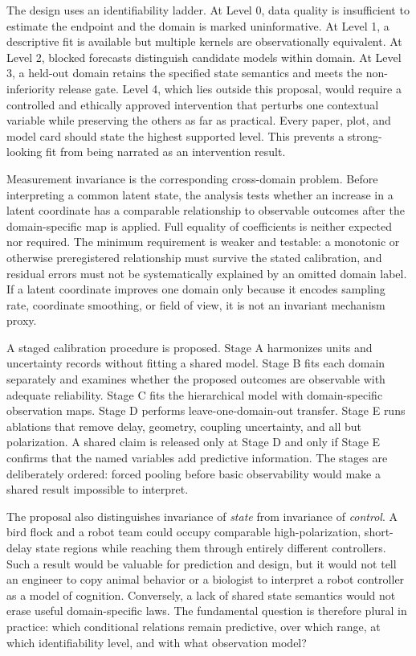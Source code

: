 \documentclass[conference]{../../../../Conference-LaTeX-template_10-17-19/IEEEtran}
\begin{document}
The design uses an identifiability ladder. At Level 0, data quality is insufficient to estimate the endpoint and the domain is marked uninformative. At Level 1, a descriptive fit is available but multiple kernels are observationally equivalent. At Level 2, blocked forecasts distinguish candidate models within domain. At Level 3, a held-out domain retains the specified state semantics and meets the non-inferiority release gate. Level 4, which lies outside this proposal, would require a controlled and ethically approved intervention that perturbs one contextual variable while preserving the others as far as practical. Every paper, plot, and model card should state the highest supported level. This prevents a strong-looking fit from being narrated as an intervention result.

Measurement invariance is the corresponding cross-domain problem. Before interpreting a common latent state, the analysis tests whether an increase in a latent coordinate has a comparable relationship to observable outcomes after the domain-specific map is applied. Full equality of coefficients is neither expected nor required. The minimum requirement is weaker and testable: a monotonic or otherwise preregistered relationship must survive the stated calibration, and residual errors must not be systematically explained by an omitted domain label. If a latent coordinate improves one domain only because it encodes sampling rate, coordinate smoothing, or field of view, it is not an invariant mechanism proxy.

A staged calibration procedure is proposed. Stage A harmonizes units and uncertainty records without fitting a shared model. Stage B fits each domain separately and examines whether the proposed outcomes are observable with adequate reliability. Stage C fits the hierarchical model with domain-specific observation maps. Stage D performs leave-one-domain-out transfer. Stage E runs ablations that remove delay, geometry, coupling uncertainty, and all but polarization. A shared claim is released only at Stage D and only if Stage E confirms that the named variables add predictive information. The stages are deliberately ordered: forced pooling before basic observability would make a shared result impossible to interpret.

The proposal also distinguishes invariance of \emph{state} from invariance of \emph{control}. A bird flock and a robot team could occupy comparable high-polarization, short-delay state regions while reaching them through entirely different controllers. Such a result would be valuable for prediction and design, but it would not tell an engineer to copy animal behavior or a biologist to interpret a robot controller as a model of cognition. Conversely, a lack of shared state semantics would not erase useful domain-specific laws. The fundamental question is therefore plural in practice: which conditional relations remain predictive, over which range, at which identifiability level, and with what observation model?
\end{document}
